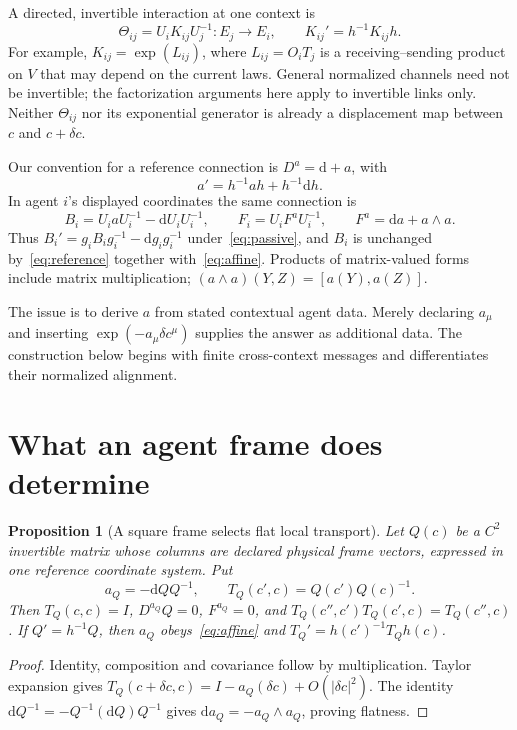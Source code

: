\documentclass[11pt]{article}
\newtheorem{proposition}[theorem]{Proposition}
\newcommand{\dd}{\mathrm d}
\begin{document}
A directed, invertible interaction at one context is
\begin{equation}
 \Theta_{ij}=U_i K_{ij}U_j^{-1}:E_j\longrightarrow E_i,
 \qquad K_{ij}'=h^{-1}K_{ij}h.
 \label{eq:point-link}
\end{equation}
For example, $K_{ij}=\exp(L_{ij})$, where $L_{ij}=O_iT_j$ is a receiving--sending product on $V$ that may depend on the current laws. General normalized channels need not be invertible; the factorization arguments here apply to invertible links only. Neither $\Theta_{ij}$ nor its exponential generator is already a displacement map between $c$ and $c+\delta c$.

Our convention for a reference connection is $D^a=\dd+a$, with
\begin{equation}
 a'=h^{-1}ah+h^{-1}\dd h.
 \label{eq:affine}
\end{equation}
In agent $i$'s displayed coordinates the same connection is
\begin{equation}
 B_i=U_i aU_i^{-1}-\dd U_iU_i^{-1},\qquad
 F_i=U_i F^aU_i^{-1},\qquad F^a=\dd a+a\wedge a.
 \label{eq:dressed}
\end{equation}
Thus $B_i'=g_iB_ig_i^{-1}-\dd g_i g_i^{-1}$ under~\eqref{eq:passive}, and $B_i$ is unchanged by~\eqref{eq:reference} together with~\eqref{eq:affine}. Products of matrix-valued forms include matrix multiplication; $(a\wedge a)(Y,Z)=[a(Y),a(Z)]$.

The issue is to derive $a$ from stated contextual agent data. Merely declaring $a_\mu$ and inserting $\exp(-a_\mu\delta c^\mu)$ supplies the answer as additional data. The construction below begins with finite cross-context messages and differentiates their normalized alignment.

\section{What an agent frame does determine}

\begin{proposition}[A square frame selects flat local transport]
Let $Q(c)$ be a $C^2$ invertible matrix whose columns are declared physical frame vectors, expressed in one reference coordinate system. Put
\begin{equation}
 a_Q=-\dd Q Q^{-1},\qquad
 T_Q(c',c)=Q(c')Q(c)^{-1}.
 \label{eq:frame}
\end{equation}
Then $T_Q(c,c)=I$, $D^{a_Q}Q=0$, $F^{a_Q}=0$, and
$T_Q(c'',c')T_Q(c',c)=T_Q(c'',c)$. If $Q'=h^{-1}Q$, then $a_Q$ obeys~\eqref{eq:affine} and $T_Q'=h(c')^{-1}T_Qh(c)$.
\end{proposition}
\begin{proof}
Identity, composition and covariance follow by multiplication. Taylor expansion gives $T_Q(c+\delta c,c)=I-a_Q(\delta c)+O(|\delta c|^2)$. The identity $\dd Q^{-1}=-Q^{-1}(\dd Q)Q^{-1}$ gives $\dd a_Q=-a_Q\wedge a_Q$, proving flatness.
\end{proof}
\end{document}
